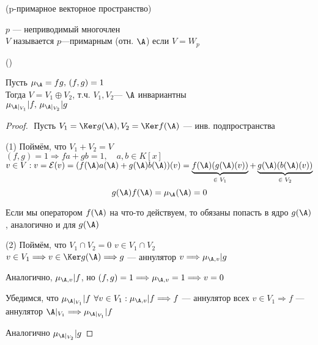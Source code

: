 \begin{conj}(p-примарное векторное пространство)

    $p$ --- неприводимый многочлен \\
    $V$ называется $p$---примарным (отн. $\A$) если $V = W_p$
\end{conj}

\begin{lemma}()

    Пусть $\mu_{\A} = fg, \, (f, g) = 1$ \\
    Тогда $V = V_1 \oplus V_2$, т.ч. $V_1, V_2 $--- $\A$ инвариантны \\
    $\mu_{\A |_{V_1}} | f, \, \mu_{\A |_{V_2}} | g$

    \begin{proof}
        $ $ \newline
        Пусть $ V_1 = \Ker  g(\A), V_2 = \Ker f(\A)$ --- инв. подпространства

        \quad (1) Поймём, что $V_1 + V_2 = V$ \\
        $(f, g) = 1 \Longrightarrow fa + gb = 1, \quad a, b \in K[x]$ \\
        $v \in V: v = \mathcal{E}(v) = (f(\A)a(\A) + g(\A)b(\A))(v) = \underbrace{f(\A)(g(\A)(v))}_{\text{$ \in V_1 $}}  + \underbrace{g(\A) (b(\A)(v))}_{\text{$ \in V_2 $}}  $ \\

        \[ g(\A)f(\A) = \mu_{\A} (\A) = 0 \]

        Если мы оператором $f(\A)$ на что-то действуем, то обязаны попасть в ядро $g(\A)$, аналогично и для $g(\A)$

        \quad (2) Поймём, что $V_1 \cap V_2 = 0$
        $ v \in V_1 \cap V_2 $ \\
        $v \in V_1 \Longrightarrow v \in \Ker g(\A) \Longrightarrow g$ --- аннулятор $v \Longrightarrow \mu_{\A, v} | g$

        Аналогично, $\mu_{\A, v} | f$, но $(f, g) = 1 \Longrightarrow \mu_{\A, v} = 1 \Longrightarrow v = 0$

        \quad Убедимся, что $ \mu_{\A |_{V_1}} | f $
        $\forall v \in V_1: \mu_{\A, v} | f \Longrightarrow f$ --- аннулятор всех $ v \in V_1 \Longrightarrow f$ --- аннулятор $\A |_{V_1} \Longrightarrow \mu_{\A |_{V_1}} | f$

        Аналогично $\mu_{\A |_{V_2}} | g$
    \end{proof} 
\end{lemma}